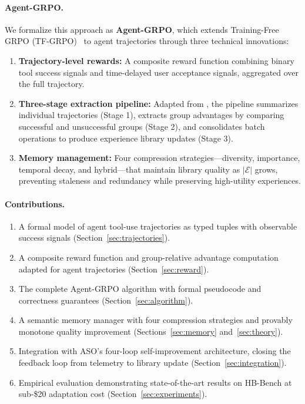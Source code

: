 \documentclass[11pt]{article}
\begin{document}
\paragraph{Agent-GRPO.}
We formalize this approach as \textbf{Agent-GRPO}, which extends
Training-Free GRPO (TF-GRPO)~\cite{hanzo2026aso} to agent trajectories through
three technical innovations:

\begin{enumerate}[leftmargin=1.5em]
    \item \textbf{Trajectory-level rewards:} A composite reward function
          combining binary tool success signals and time-delayed user acceptance
          signals, aggregated over the full trajectory.
    \item \textbf{Three-stage extraction pipeline:} Adapted from
          \cite{tencent2025youtoagent}, the pipeline summarizes individual
          trajectories (Stage 1), extracts group advantages by comparing
          successful and unsuccessful groups (Stage 2), and consolidates batch
          operations to produce experience library updates (Stage 3).
    \item \textbf{Memory management:} Four compression strategies---diversity,
          importance, temporal decay, and hybrid---that maintain library quality
          as $|\mathcal{E}|$ grows, preventing staleness and redundancy while
          preserving high-utility experiences.
\end{enumerate}

\paragraph{Contributions.}
\begin{enumerate}[leftmargin=1.5em]
    \item A formal model of agent tool-use trajectories as typed tuples with
          observable success signals (Section~\ref{sec:trajectories}).
    \item A composite reward function and group-relative advantage computation
          adapted for agent trajectories (Section~\ref{sec:reward}).
    \item The complete Agent-GRPO algorithm with formal pseudocode and
          correctness guarantees (Section~\ref{sec:algorithm}).
    \item A semantic memory manager with four compression strategies and
          provably monotone quality improvement (Sections~\ref{sec:memory}
          and~\ref{sec:theory}).
    \item Integration with ASO's four-loop self-improvement architecture, closing
          the feedback loop from telemetry to library update
          (Section~\ref{sec:integration}).
    \item Empirical evaluation demonstrating state-of-the-art results on
          HB-Bench at sub-\$20 adaptation cost (Section~\ref{sec:experiments}).
\end{enumerate}
\end{document}
